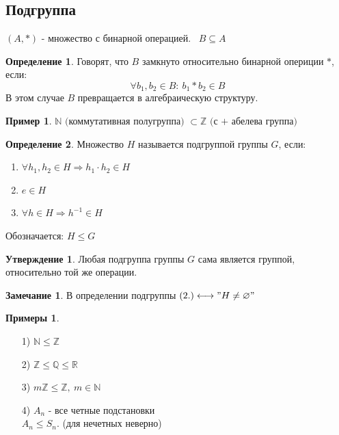 \documentclass[a4paper, 12pt]{article}
\newcommand{\R}{\mathbb R}
\newcommand{\Q}{\mathbb Q}
\newcommand{\Z}{\mathbb Z}
\newcommand{\N}{\mathbb N}
\newcommand\tab[1][.5cm]{\hspace*{#1}}
\theoremstyle{definition}
\newtheorem*{definition}{Определение}
\newtheorem*{subtheorem}{Утверждение}
\newtheorem*{remark}{Замечание}
\newtheorem*{example}{Примеры}
\newtheorem*{example1}{Пример}
\begin{document}
  \subsection{Подгруппа}
  $(A,*)$ - множество с бинарной операцией. \ $B \subseteq A$ 
  \begin{definition}
    Говорят, что $B$ замкнуто относительно бинарной опериции $*$, если: $$\forall b_1,b_2 \in B: \ b_1 * b_2 \in B$$
    В этом случае $B$ превращается в алгебраическую структуру.   
  \end{definition}  
  \begin{example1}
    $\N \text{ (коммутативная полугруппа) }  \subset \Z \text{ (с + абелева группа) }$ 
  \end{example1}
  \begin{definition}
    Множество $H$ называется подгруппой группы $G$, если:
    \begin{enumerate}
      \item $\forall h_1,h_2 \in H \Longrightarrow h_1 \cdot h_2 \in H$ 
      \item $e \in H$
      \item $\forall h \in H \Longrightarrow h^{-1} \in H$  
    \end{enumerate}
    Обозначается: $H \leq G$ 
  \end{definition} 
  \begin{subtheorem}
    Любая подгруппа группы $G$ сама является группой, относительно той же операции.
  \end{subtheorem} 
  \begin{remark}
    В определении подгруппы $(2.) \longleftrightarrow "H \neq \varnothing"$ 
  \end{remark} 
  \begin{example}\tab
    \begin{itemize}
      \item[1)] $\N\leq \Z$
      \item[2)] $\Z \leq \Q \leq \R$
      \item[3)] $m\Z \leq\Z, \ m\in \N$   
      \item[4)] $A_n$ - все четные подстановки\\
      $A_n \leq S_n$. (для нечетных неверно)    
    \end{itemize}
  \end{example}
\end{document}
